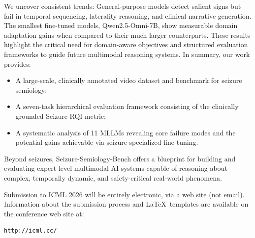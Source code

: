 \documentclass{article}
\theoremstyle{plain}
\theoremstyle{definition}
\theoremstyle{remark}
\begin{document}
We uncover consistent trends: 
General-purpose models detect salient signs but fail in temporal sequencing, laterality reasoning, and clinical narrative generation. The smallest fine-tuned models,  Qwen2.5-Omni-7B, show measurable domain adaptation gains when compared to their much larger counterparts. 
These results highlight the critical need for domain-aware objectives and structured evaluation frameworks to guide future multimodal reasoning systems. In summary, our work provides:
\begin{itemize}
    \item A large-scale, clinically annotated video dataset and benchmark for seizure semiology;
    \item A seven-task hierarchical evaluation framework consisting of the clinically grounded Seizure-RQI metric;
    \item A systematic analysis of 11 MLLMs revealing core failure modes and the potential gains achievable via seizure-specialized fine-tuning.
\end{itemize}

Beyond seizures, Seizure-Semiology-Bench offers a blueprint for building and evaluating expert-level multimodal AI systems capable of reasoning about complex, temporally dynamic, and safety-critical real-world phenomena.
\fi


\iffalse

Submission to ICML 2026 will be entirely electronic, via a web site
(not email). Information about the submission process and \LaTeX\ templates
are available on the conference web site at:
\begin{center}
  \texttt{http://icml.cc/}
\end{center}
\end{document}
